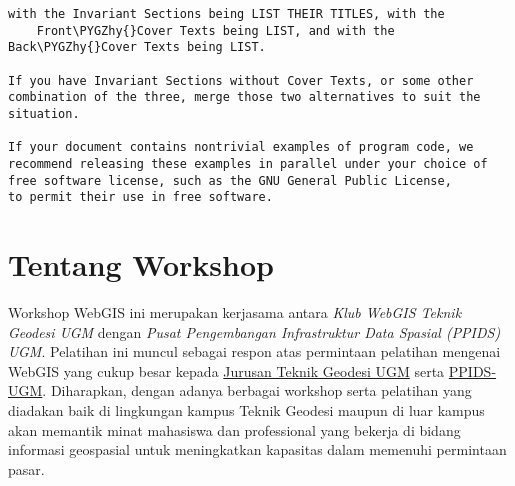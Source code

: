 \documentclass[letterpaper,10pt,english]{sphinxmanual}
\def\PYGZhy{\char`\-}
\begin{document}
\begin{Verbatim}[frame=single,commandchars=\\\{\}]
    with the Invariant Sections being LIST THEIR TITLES, with the
    Front\PYGZhy{}Cover Texts being LIST, and with the Back\PYGZhy{}Cover Texts being LIST.

If you have Invariant Sections without Cover Texts, or some other
combination of the three, merge those two alternatives to suit the
situation.

If your document contains nontrivial examples of program code, we
recommend releasing these examples in parallel under your choice of
free software license, such as the GNU General Public License,
to permit their use in free software.
\end{Verbatim}


\chapter{Tentang Workshop}
\label{index:tentang-workshop}\label{index:id1}
Workshop WebGIS ini merupakan kerjasama antara \emph{Klub WebGIS Teknik Geodesi
UGM} dengan \emph{Pusat Pengembangan Infrastruktur Data Spasial (PPIDS)
UGM}. Pelatihan ini muncul sebagai respon atas permintaan pelatihan mengenai
WebGIS yang
cukup besar kepada \href{http://geodesi.ugm.ac.id}{Jurusan Teknik Geodesi UGM}
serta \href{http://ppids.ft.ugm.ac.id}{PPIDS-UGM}. Diharapkan, dengan adanya
berbagai workshop serta pelatihan yang diadakan baik di lingkungan kampus
Teknik Geodesi maupun di luar kampus akan memantik minat mahasiswa dan
professional yang bekerja di bidang informasi geospasial untuk meningkatkan
kapasitas dalam memenuhi permintaan pasar.
\end{document}
